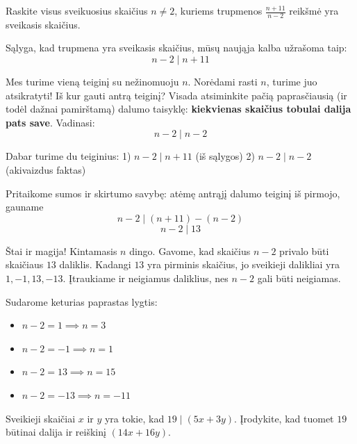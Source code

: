 \documentclass[11pt,a4paper]{scrartcl}
\begin{document}
\begin{example}
Raskite visus sveikuosius skaičius \(n\ne2\), kuriems trupmenos \(\frac{n+11}{n-2}\) reikšmė yra sveikasis skaičius.
\end{example}
\begin{solution}
Sąlyga, kad trupmena yra sveikasis skaičius, mūsų naująja kalba užrašoma taip:
\begin{equation*} 
n-2 \mid n+11 
\end{equation*}

Mes turime vieną teiginį su nežinomuoju \(n\). Norėdami rasti \(n\), turime juo atsikratyti! Iš kur gauti antrą teiginį? Visada atsiminkite pačią paprasčiausią (ir todėl dažnai pamirštamą) dalumo taisyklę: \textbf{kiekvienas skaičius tobulai dalija pats save}. Vadinasi:
\begin{equation*} 
n-2 \mid n-2 
\end{equation*}

Dabar turime du teiginius:
1) \(n-2 \mid n+11\) (iš sąlygos)
2) \(n-2 \mid n-2\) (akivaizdus faktas)

Pritaikome sumos ir skirtumo savybę: atėmę antrąjį dalumo teiginį iš pirmojo, gauname
\begin{equation*} 
n-2 \mid (n+11) - (n-2) 
\end{equation*}
\begin{equation*} 
n-2 \mid 13 
\end{equation*}

Štai ir magija! Kintamasis \(n\) dingo. Gavome, kad skaičius \(n-2\) privalo būti skaičiaus $13$ daliklis. 
Kadangi $13$ yra pirminis skaičius, jo sveikieji dalikliai yra $1,-1,13,-13$. Įtraukiame ir neigiamus daliklius, nes \(n-2\) gali būti neigiamas.

Sudarome keturias paprastas lygtis:
\begin{itemize}
    \item \(n-2 = 1 \implies n = 3\)
    \item \(n-2 = -1 \implies n = 1\)
    \item \(n-2 = 13 \implies n = 15\)
    \item \(n-2 = -13 \implies n = -11\)
\end{itemize}
\end{solution}

\vspace{0.5cm}

\begin{example}
Sveikieji skaičiai \(x\) ir \(y\) yra tokie, kad \(19 \mid (5x + 3y)\). Įrodykite, kad tuomet $19$ būtinai dalija ir reiškinį \((14x + 16y)\).
\end{example}
\end{document}

